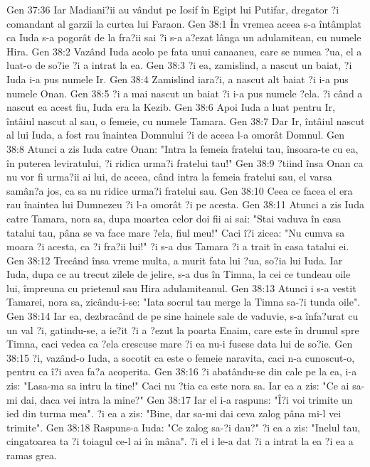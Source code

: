 Gen 37:36  Iar Madiani?ii au vândut pe Iosif în Egipt lui Putifar, dregator ?i comandant al garzii la curtea lui Faraon.
Gen 38:1  În vremea aceea s-a întâmplat ca Iuda s-a pogorât de la fra?ii sai ?i s-a a?ezat lânga un adulamitean, cu numele Hira.
Gen 38:2  Vazând Iuda acolo pe fata unui canaaneu, care se numea ?ua, el a luat-o de so?ie ?i a intrat la ea.
Gen 38:3  ?i ea, zamislind, a nascut un baiat, ?i Iuda i-a pus numele Ir.
Gen 38:4  Zamislind iara?i, a nascut alt baiat ?i i-a pus numele Onan.
Gen 38:5  ?i a mai nascut un baiat ?i i-a pus numele ?ela. ?i când a nascut ea acest fiu, Iuda era la Kezib.
Gen 38:6  Apoi Iuda a luat pentru Ir, întâiul nascut al sau, o femeie, cu numele Tamara.
Gen 38:7  Dar Ir, întâiul nascut al lui Iuda, a fost rau înaintea Domnului ?i de aceea l-a omorât Domnul.
Gen 38:8  Atunci a zis Iuda catre Onan: "Intra la femeia fratelui tau, însoara-te cu ea, în puterea leviratului, ?i ridica urma?i fratelui tau!"
Gen 38:9  ?tiind însa Onan ca nu vor fi urma?ii ai lui, de aceea, când intra la femeia fratelui sau, el varsa samân?a jos, ca sa nu ridice urma?i fratelui sau.
Gen 38:10  Ceea ce facea el era rau înaintea lui Dumnezeu ?i l-a omorât ?i pe acesta.
Gen 38:11  Atunci a zis Iuda catre Tamara, nora sa, dupa moartea celor doi fii ai sai: "Stai vaduva în casa tatalui tau, pâna se va face mare ?ela, fiul meu!" Caci î?i zicea: "Nu cumva sa moara ?i acesta, ca ?i fra?ii lui!" ?i s-a dus Tamara ?i a trait în casa tatalui ei.
Gen 38:12  Trecând însa vreme multa, a murit fata lui ?ua, so?ia lui Iuda. Iar Iuda, dupa ce au trecut zilele de jelire, s-a dus în Timna, la cei ce tundeau oile lui, împreuna cu prietenul sau Hira adulamiteanul.
Gen 38:13  Atunci i s-a vestit Tamarei, nora sa, zicându-i-se: "Iata socrul tau merge la Timna sa-?i tunda oile".
Gen 38:14  Iar ea, dezbracând de pe sine hainele sale de vaduvie, s-a înfa?urat cu un val ?i, gatindu-se, a ie?it ?i a ?ezut la poarta Enaim, care este în drumul spre Timna, caci vedea ca ?ela crescuse mare ?i ea nu-i fusese data lui de so?ie.
Gen 38:15  ?i, vazând-o Iuda, a socotit ca este o femeie naravita, caci n-a cunoscut-o, pentru ca î?i avea fa?a acoperita.
Gen 38:16  ?i abatându-se din cale pe la ea, i-a zis: "Lasa-ma sa intru la tine!" Caci nu ?tia ca este nora sa. Iar ea a zis: "Ce ai sa-mi dai, daca vei intra la mine?"
Gen 38:17  Iar el i-a raspuns: "Î?i voi trimite un ied din turma mea". ?i ea a zis: "Bine, dar sa-mi dai ceva zalog pâna mi-l vei trimite".
Gen 38:18  Raspuns-a Iuda: "Ce zalog sa-?i dau?" ?i ea a zis: "Inelul tau, cingatoarea ta ?i toiagul ce-l ai în mâna". ?i el i le-a dat ?i a intrat la ea ?i ea a ramas grea.
